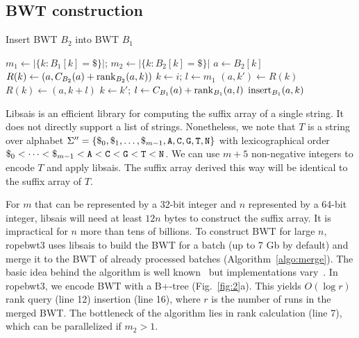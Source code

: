 \documentclass[webpdf,contemporary,large,namedate]{oup-authoring-template}%
\begin{document}
\subsection{BWT construction}

\begin{algorithm}[bt]
	\caption{Insert BWT $B_2$ into BWT $B_1$}\label{algo:merge}
	\begin{algorithmic}[1]
			\State $m_1\gets|\{k:B_1[k]=\$\}|$; $m_2\gets|\{k:B_2[k]=\$\}|$
				\State $a\gets B_2[k]$
				\State $R(k)\gets (a,C_{B_2}(a)+{\rm rank}_{B_2}(a,k))$
			\EndFor
				\State $k\gets i$; $l\gets m_1$
				\Repeat
					\State $(a,k')\gets R(k)$
					\State $R(k)\gets(a,k+l)$
					\State $k\gets k'$; $l\gets C_{B_1}(a)+{\rm rank}_{B_1}(a,l)$
			\EndFor
				\State ${\rm insert}_{B_1}(a,k)$
			\EndFor
		\EndProcedure
	\end{algorithmic}
\end{algorithm}

Libsais is an efficient library for computing the suffix array of a single string.
It does not directly support a list of strings.
Nonetheless, we note that $T$ is a string over alphabet $\Sigma''=\{\$_0,\$_1,\ldots,\$_{m-1},{\tt A},{\tt C},{\tt G},{\tt T},{\tt N}\}$
with lexicographical order $\$_0<\cdots<\$_{m-1}<{\tt A}<{\tt C}<{\tt G}<{\tt T}<{\tt N}$.
We can use $m+5$ non-negative integers to encode $T$ and apply libsais.
The suffix array derived this way will be identical to the suffix array of $T$.

For $m$ that can be represented by a 32-bit integer and $n$ represented by a 64-bit integer,
libsais will need at least $12n$ bytes to construct the suffix array.
It is impractical for $n$ more than tens of billions.
To construct BWT for large $n$, ropebwt3 uses libsais to build the BWT for a batch (up to 7 Gb by default)
and merge it to the BWT of already processed batches (Algorithm~\ref{algo:merge}).
The basic idea behind the algorithm is well known~\citep{DBLP:conf/latin/FerraginaGM10}
but implementations vary~\citep{DBLP:conf/dcc/Siren16,DBLP:conf/dcc/Oliva0SMKGB21}.
In ropebwt3, we encode BWT with a B+-tree (Fig.~\ref{fig:2}a).
This yields $O(\log r)$ rank query (line 12) insertion (line 16), where $r$ is the number of runs in the merged BWT.
The bottleneck of the algorithm lies in rank calculation (line 7), which can be parallelized if $m_2>1$.
\end{document}
